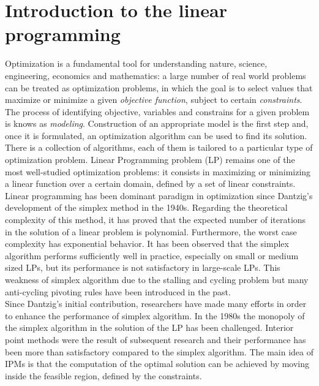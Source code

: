 \documentclass[a4paper,10 pt,titlepage,twoside]{book}
\theoremstyle{plain}
\theoremstyle{definition}
\theoremstyle{remark}
\begin{document}
\chapter{Introduction to the linear programming}
Optimization is a fundamental tool for understanding nature, science, engineering, economics and mathematics: a large number of real world problems can be treated as optimization problems, in which the goal is to select values that maximize or minimize a given \textit{objective function}, subject to certain \textit{constraints}.\\ The process of identifying objective, variables and constrains for a given problem is knows as \textit{modeling}. Construction of an appropriate model is the first step and, once it is formulated, an optimization algorithm can be used to find its solution. There is a collection of algorithms, each of them is tailored to a particular type of optimization problem. Linear Programming problem (LP) remains one of the most well-studied optimization problems: it consists in maximizing or minimizing a linear function over a certain domain, defined by a set of linear constraints.\\
Linear programming has been dominant paradigm in optimization since Dantzig's development of the simplex method in the 1940s. Regarding the theoretical complexity of this method, it has proved that the expected number of iterations in the solution of a linear problem is polynomial. Furthermore, the worst case complexity has exponential behavior. It has been observed that the simplex algorithm performs sufficiently well in practice, especially on small or medium sized LPs, but its performance is not satisfactory in large-scale LPs. This weakness of simplex algorithm due to the stalling and cycling problem but many anti-cycling pivoting rules have been introduced in the past.\\
Since Dantzig's initial contribution, researchers have made many efforts in order to enhance the performance of simplex algorithm. In the 1980s the monopoly of the simplex algorithm in the solution of the LP has been challenged. Interior point methods were the result of subsequent research and their performance has been more than satisfactory compared to the simplex algorithm. The main idea of IPMs is that the computation of the optimal solution can be achieved by moving inside the feasible region, defined by the constraints. \\
\end{document}
